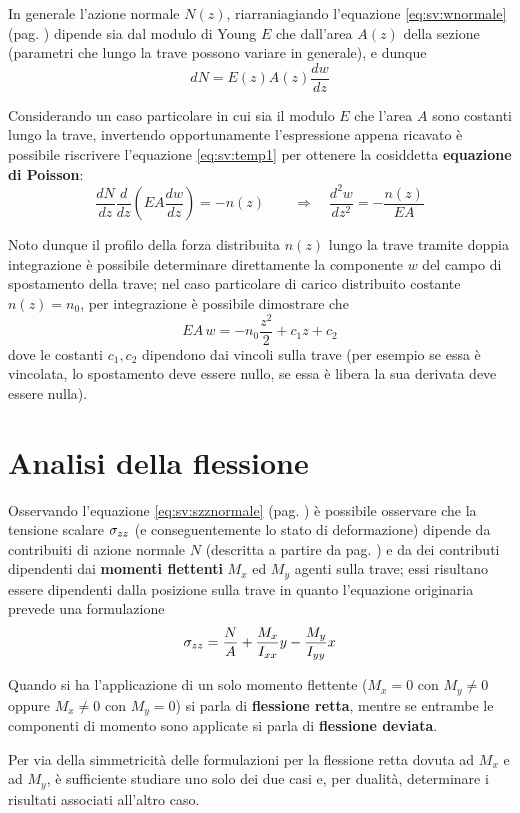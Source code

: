 		In generale l'azione normale $N(z)$, riarraniagiando l'equazione \ref{eq:sv:wnormale} (pag. \pageref{eq:sv:wnormale}) dipende sia dal modulo di Young $E$ che dall'area $A(z)$ della sezione (parametri che lungo la trave possono variare in generale), e dunque
		\[ dN = E(z)A(z) \frac {dw}{dz}\]
		\begin{concetto}
			Considerando un caso particolare in cui sia il modulo $E$ che l'area $A$ sono costanti lungo la trave, invertendo opportunamente l'espressione appena ricavato è possibile riscrivere l'equazione \ref{eq:sv:temp1} per ottenere la cosiddetta \textbf{equazione di Poisson}:
			\begin{equation}
				\frac{dN}{dz} \frac d {dz} \left(EA \frac{dw}{dz}\right) = - n(z) \qquad \Rightarrow \quad \frac{d^2w}{dz^2} = - \frac{n(z)}{EA}
			\end{equation}
		\end{concetto}
		Noto dunque il profilo della forza distribuita $n(z)$ lungo la trave tramite doppia integrazione è possibile determinare direttamente la componente $w$ del campo di spostamento della trave; nel caso particolare di carico distribuito costante $n(z) = n_0$, per integrazione è possibile dimostrare che
		\[ EA\, w = -n_0 \frac {z^2}2 + c_1 z + c_2\]
		dove le costanti $c_1,c_2$ dipendono dai vincoli sulla trave (per esempio se essa è vincolata, lo spostamento deve essere nullo, se essa è libera la sua derivata deve essere nulla).
	
\section{Analisi della flessione}
	Osservando l'equazione \ref{eq:sv:szznormale} (pag. \pageref{eq:sv:szznormale}) è possibile osservare che la tensione scalare $\sigma_{zz}$ (e conseguentemente lo stato di deformazione) dipende da contribuiti di azione normale $N$ (descritta a partire da pag. \pageref{sec:sv:normale}) e da dei contributi dipendenti dai \textbf{momenti flettenti} $M_x$ ed $M_y$ agenti sulla trave; essi risultano essere dipendenti dalla posizione sulla trave in quanto l'equazione originaria prevede una formulazione
	\[\sigma_{zz} = \frac NA + \frac {M_x} {I_{xx}} y - \frac {M_y} {I_{yy}} x \]
	\begin{concetto}
		Quando si ha l'applicazione di un solo momento flettente ($M_x = 0$ con $M_y\neq 0$ oppure $M_x\neq 0$ con $M_y=0$) si parla di \textbf{flessione retta}, mentre se entrambe le componenti di momento sono applicate si parla di \textbf{flessione deviata}.
	\end{concetto}
	\begin{osservazione}
		Per via della simmetricità delle formulazioni per la flessione retta dovuta ad $M_x$ e ad $M_y$, è sufficiente studiare uno solo dei due casi e, per dualità, determinare i risultati associati all'altro caso.
	\end{osservazione}
	
